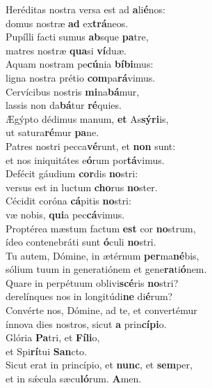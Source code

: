 \evenverse Heréditas nostra versa est ad \textbf{a}li\textbf{é}nos:~\*\\
\evenverse domus nostræ \textbf{ad} ex\textbf{trá}neos.\\
\oddverse Pupílli facti sumus \textbf{ab}sque \textbf{pa}tre,~\*\\
\oddverse matres nostræ \textbf{qua}si \textbf{ví}duæ.\\
\evenverse Aquam nostram pe\textbf{cú}nia \textbf{bí}\textbf{bi}mus:~\*\\
\evenverse ligna nostra prétio \textbf{com}pa\textbf{rá}vimus.\\
\oddverse Cervícibus nostris \textbf{mi}na\textbf{bá}mur,~\*\\
\oddverse lassis non da\textbf{bá}tur \textbf{ré}quies.\\
\evenverse Ægýpto dédimus manum, \textbf{et} As\textbf{sý}\textbf{ri}is,~\*\\
\evenverse ut satura\textbf{ré}mur \textbf{pa}ne.\\
\oddverse Patres nostri pecca\textbf{vé}runt, et \textbf{non} sunt:~\*\\
\oddverse et nos iniquitátes e\textbf{ó}rum por\textbf{tá}vimus.\\
\evenverse Defécit gáudium \textbf{cor}dis \textbf{no}stri:~\*\\
\evenverse versus est in luctum \textbf{cho}rus \textbf{no}ster.\\
\oddverse Cécidit coróna \textbf{cá}pitis \textbf{no}stri:~\*\\
\oddverse væ nobis, \textbf{qui}a pec\textbf{cá}vimus.\\
\evenverse Proptérea mæstum factum \textbf{est} cor \textbf{no}strum,~\*\\
\evenverse ídeo contenebráti sunt \textbf{ó}culi \textbf{no}stri.\\
\oddverse Tu autem, Dómine, in ætérnum \textbf{per}ma\textbf{né}bis,~\*\\
\oddverse sólium tuum in generatiónem et gene\textbf{ra}ti\textbf{ó}nem.\\
\evenverse Quare in perpétuum oblivi\textbf{scé}ris \textbf{no}stri?~\*\\
\evenverse derelínques nos in longitúdi\textbf{ne} di\textbf{é}rum?\\
\oddverse Convérte nos, Dómine, ad te, et convertémur~\*\\
\oddverse ínnova dies nostros, sicut \textbf{a} prin\textbf{cí}\textbf{pi}o.\\
\evenverse Glória \textbf{Pa}tri, et \textbf{Fí}\textbf{li}o,~\*\\
\evenverse et Spi\textbf{rí}tui \textbf{San}cto.\\
\oddverse Sicut erat in princípio, et \textbf{nunc}, et \textbf{sem}per,~\*\\
\oddverse et in sǽcula sæcu\textbf{ló}rum. \textbf{A}men.\\
